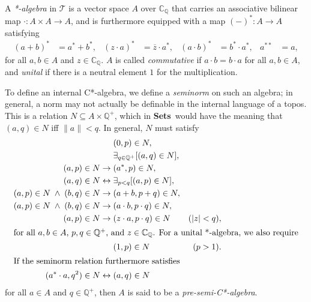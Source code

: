 \documentclass[12pt]{article}
\newcommand{\Sets}{\mbox{\textbf{Sets}}}
\newcommand{\CT}{{\mathcal T}} \newcommand{\CV}{{\mathcal V}}
\newcommand{\cpxrat}{\ensuremath{\field{C}_\field{Q}}}
\newcommand{\field}[1]{\ensuremath{\mathbb{#1}}}
\begin{document}
 A \emph{*-algebra} in $\CT$ is a vector space ${A}$ over $\cpxrat$
  that carries an associative bilinear map
$\cdot\colon{A}\times{A}\to{A}$,
and is furthermore equipped with a map
$(-)^*\colon{A}\to{A}$ satisfying
\begin{align*}
    (a+b)^* & = a^* + b^*,
  & (z\cdot a)^* & = \overline{z} \cdot a^*,
  & (a\cdot b)^* & = b^* \cdot a^*,
  & a^{**} & = a,
\end{align*}
for all $a,b \in {A}$ and $z \in \cpxrat$. $A$ is called
\emph{commutative} if $a \cdot b = b \cdot a$ for all $a,b \in
{A}$, and \emph{unital} if there is a neutral element $1$ for the
multiplication.

To define an internal C*-algebra, we define a {\it seminorm} on such an algebra;
in
general, a norm may not actually be definable in the internal language of a
topos. This is a relation  $N \subseteq
{A} \times \field{Q}^+$, which in \Sets\  would have the meaning that
$(a,q)\in N$ iff $\|a\|< q$. In general, $N$ must satisfy
\begin{align*}
   &\;(0,p) \in N, \\
   &\;\exists_{q \in \field{Q}^+}[ (a,q) \in N ], \\
   (a,p) \in N \rightarrow &\; (a^*,p) \in N, \\
   (a,q) \in N \leftrightarrow &\;\exists_{p<q}[ (a,p) \in N ], \\
   (a,p) \in N \;\wedge\; (b,q) \in N \rightarrow&\;
     (a+b,p+q) \in N, \\
   (a,p) \in N \;\wedge\; (b,q) \in N \rightarrow&\;
     (a \cdot b,p \cdot q) \in N, \\
   (a,p) \in N \rightarrow &\; (z\cdot a,p \cdot q) \in N & (|z|<q), \\
\intertext{for all $a,b \in {A}$, $p,q \in \field{Q}^+$, and $z
\in \cpxrat$. For a unital *-algebra, we also require}
   &\;(1,p) \in N & (p>1).\\
\intertext{If the seminorm relation furthermore satisfies }
  (a^* \cdot a, q^2) \in N \leftrightarrow&\; (a,q) \in N
\end{align*}
for all $a \in {A}$ and $q \in \field{Q}^+$, then ${A}$ is said
to be a \emph{pre-semi-C*-algebra}.
\end{document}
